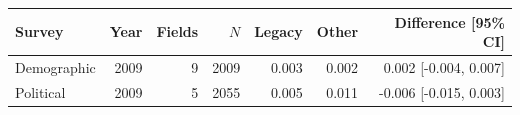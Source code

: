 \begin{tabular}{lrrrrrr}
\toprule
Survey & Year & Fields & $N$ & Legacy & Other & Difference [95\% CI] \\
\midrule
Demographic & 2009 & 9 & 2009 & 0.003 & 0.002 & 0.002 [-0.004, 0.007] \\
Political & 2009 & 5 & 2055 & 0.005 & 0.011 & -0.006 [-0.015, 0.003] \\
\bottomrule
\end{tabular}
